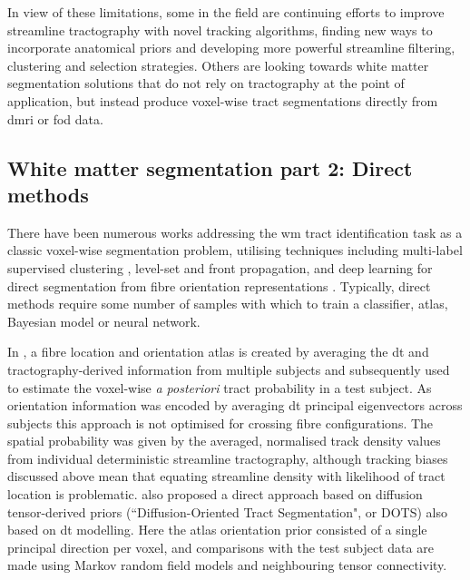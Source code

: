 In view of these limitations, some in the field are continuing efforts to improve streamline tractography with novel tracking algorithms, finding new ways to incorporate anatomical priors and developing more powerful streamline filtering, clustering and selection strategies.
Others are looking towards white matter segmentation solutions that do not rely on tractography at the point of application, but instead produce voxel-wise tract segmentations directly from \gls{dmri} or \gls{fod} data.

\subsection{White matter segmentation part 2: Direct methods}

There have been numerous works addressing the \gls{wm} tract identification task as a classic voxel-wise segmentation problem, utilising techniques including multi-label supervised clustering \autocite{Ratnarajah2014}, level-set and front propagation\textcite{Nazem-Zadeh2011, Hao2014}, and deep learning for direct segmentation from fibre orientation representations \autocite{Wasserthal2018,Li2020}.
Typically, direct methods require some number of samples with which to train a classifier, atlas, Bayesian model or neural network.

In \textcite{Hagler2009}, a fibre location and orientation atlas is created by averaging the \gls{dt} and tractography-derived information from multiple subjects and subsequently used to estimate the voxel-wise \textit{a posteriori} tract probability in a test subject.
As orientation information was encoded by averaging \gls{dt} principal eigenvectors across subjects this approach is not optimised for crossing fibre configurations.
The spatial probability was given by the averaged, normalised track density values from individual deterministic streamline tractography, although tracking biases discussed above mean that equating streamline density with likelihood of tract location is problematic\autocite{Rheault2019,Smith2013}.
\textcite{Bazin2011} also proposed a direct approach based on diffusion tensor-derived priors (``Diffusion-Oriented Tract Segmentation", or DOTS) also based on \gls{dt} modelling.
Here the atlas orientation prior consisted of a single principal direction per voxel, and comparisons with the test subject data are made using Markov random field models and neighbouring tensor connectivity.

